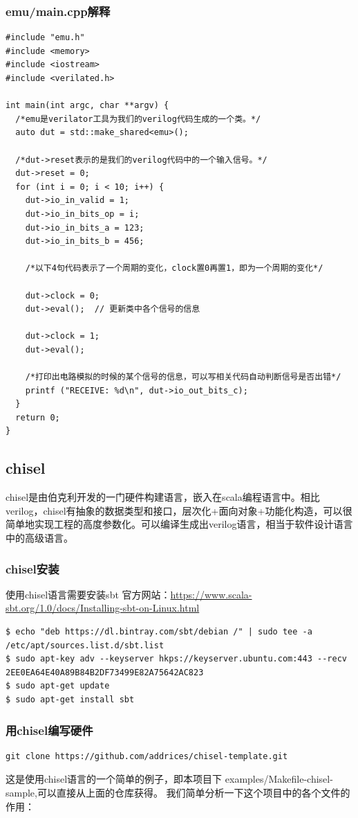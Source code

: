 \documentclass[lang=cn,11pt,a4paper]{elegantpaper}
\begin{document}
\subsubsection{emu/main.cpp解释}
\begin{lstlisting}
#include "emu.h"
#include <memory>
#include <iostream>
#include <verilated.h>

int main(int argc, char **argv) {
  /*emu是verilator工具为我们的verilog代码生成的一个类。*/
  auto dut = std::make_shared<emu>();	

  /*dut->reset表示的是我们的verilog代码中的一个输入信号。*/
  dut->reset = 0;					
  for (int i = 0; i < 10; i++) {
    dut->io_in_valid = 1;
    dut->io_in_bits_op = i;
    dut->io_in_bits_a = 123;
    dut->io_in_bits_b = 456;

    /*以下4句代码表示了一个周期的变化，clock置0再置1，即为一个周期的变化*/

    dut->clock = 0;
    dut->eval();  // 更新类中各个信号的信息

    dut->clock = 1;
    dut->eval();

    /*打印出电路模拟的时候的某个信号的信息，可以写相关代码自动判断信号是否出错*/
    printf ("RECEIVE: %d\n", dut->io_out_bits_c);
  }
  return 0;
}
\end{lstlisting}

\subsection{chisel}
chisel是由伯克利开发的一门硬件构建语言，嵌入在scala编程语言中。相比verilog，chisel有抽象的数据类型和接口，层次化+面向对象+功能化构造，可以很简单地实现工程的高度参数化。可以编译生成出verilog语言，相当于软件设计语言中的高级语言。

\subsubsection{chisel安装}
使用chisel语言需要安装sbt
官方网站：\url{https://www.scala-sbt.org/1.0/docs/Installing-sbt-on-Linux.html}

\begin{lstlisting}
$ echo "deb https://dl.bintray.com/sbt/debian /" | sudo tee -a /etc/apt/sources.list.d/sbt.list
$ sudo apt-key adv --keyserver hkps://keyserver.ubuntu.com:443 --recv 2EE0EA64E40A89B84B2DF73499E82A75642AC823
$ sudo apt-get update
$ sudo apt-get install sbt
\end{lstlisting}

\subsubsection{用chisel编写硬件}
\begin{lstlisting}
git clone https://github.com/addrices/chisel-template.git
\end{lstlisting}
这是使用chisel语言的一个简单的例子，即本项目下 examples/Makefile-chisel-sample,可以直接从上面的仓库获得。
我们简单分析一下这个项目中的各个文件的作用：
\end{document}
